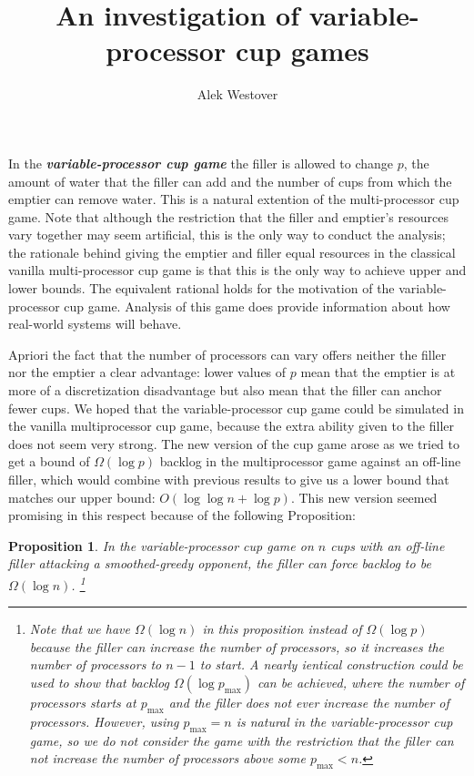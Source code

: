 \documentclass[twocolumn]{article}[11pt]
\title{An investigation of variable-processor cup games}
\author{Alek Westover}
\newcommand{\defn}[1]{{\textit{\textbf{\boldmath #1}}}}
\newtheorem{proposition}{Proposition}
\begin{document}
\maketitle

In the \defn{variable-processor cup game} the filler is allowed to change $p$,
the amount of water that the filler can add and the number of cups from which
the emptier can remove water. This is a natural extention of the
multi-processor cup game. Note that although the restriction that the filler
and emptier's resources vary together may seem artificial, this is the only way
to conduct the analysis; the rationale behind giving the emptier and filler
equal resources in the classical vanilla multi-processor cup game is that 
this is the only way to achieve upper and lower bounds. The equivalent rational holds
for the motivation of the variable-processor cup game. Analysis of this game
does provide information about how real-world systems will behave.

Apriori the fact that the number of processors can vary offers neither the
filler nor the emptier a clear advantage: lower values of $p$ mean that the
emptier is at more of a discretization disadvantage but also mean that the
filler can anchor fewer cups.  We hoped that the variable-processor cup game
could be simulated in the vanilla multiprocessor cup game, because the extra
ability given to the filler does not seem very strong. The new version of the
cup game arose as we tried to get a bound of $\Omega(\log p)$ backlog in the
multiprocessor game against an off-line filler, which would combine with
previous results to give us a lower bound that matches our upper bound:
$O(\log\log n + \log p)$. This new version seemed promising in this respect
because of the following Proposition:

\begin{proposition}
  \label{prop:dprand}
  In the variable-processor cup game on $n$ cups with an off-line filler
  attacking a smoothed-greedy opponent, the filler can force backlog to be
  $\Omega(\log n)$.
\footnote{Note that we have $\Omega(\log n)$ in this proposition instead of $\Omega(\log
p)$ because the filler can increase the number of processors, so it increases
the number of processors to $n-1$ to start. A nearly ientical construction
could be used to show that backlog $\Omega(\log p_{\max})$ can be achieved,
where the number of processors starts at $p_{\max}$ and the filler does not
ever increase the number of processors. However, using $p_{\max} = n$ is 
natural in the variable-processor cup game, so we do not consider the game with 
the restriction that the filler can not increase the number of processors above
some $p_{\max} < n$.}
\end{proposition}
\end{document}
